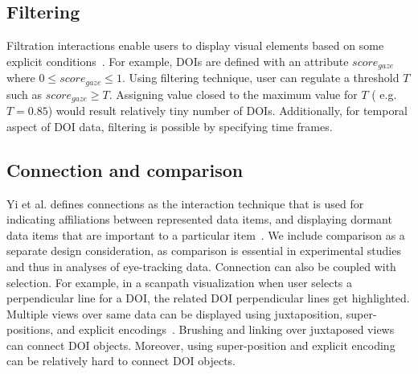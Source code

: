 	
\subsection{Filtering} Filtration interactions enable users to display visual elements based on some explicit conditions~\cite{yi2007toward}. For example, DOIs are defined with an attribute $score_{gaze}$ where $0 \leq score_{gaze} \leq 1$. Using filtering technique, user can regulate a threshold $T$ such as $score_{gaze} \geq T$. Assigning value closed to the maximum value for $T$ ( e.g. $T =0.85$) would result relatively tiny number of DOIs. Additionally, for temporal aspect of DOI data, filtering is possible by specifying time frames. 	

	
	\subsection{Connection and comparison} Yi et al. defines connections as the interaction technique that is used for indicating affiliations between represented data items, and displaying dormant data items that are important to a particular item~\cite{yi2007toward}. We include comparison as a separate design consideration, as comparison is essential in experimental studies and thus in analyses of eye-tracking data. Connection can also be coupled with selection. For example, in a scanpath visualization when user selects a perpendicular line for a DOI, the related DOI perpendicular lines get highlighted. Multiple views over same data can be displayed using juxtaposition, super-positions, and explicit encodings~\cite{gleicher2011visual}. Brushing and linking over juxtaposed views can connect DOI objects. Moreover, using super-position and explicit encoding can be relatively hard to connect DOI objects. 
